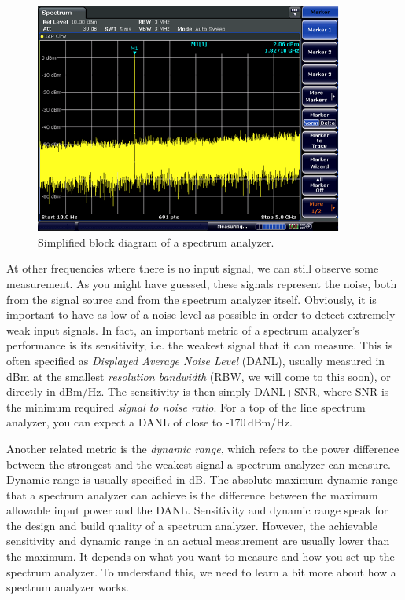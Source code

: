 \documentclass[letterpaper, 11pt]{article}
\begin{document}
\begin{figure}[h]
	\centering
	\includegraphics[width=4in]{sa-screen}
	\caption{Simplified block diagram of a spectrum analyzer.}
	\label{fig:sa-screen}
\end{figure}

At other frequencies where there is no input signal, we can still observe some measurement. As you might have guessed, these signals represent the noise, both from the signal source and from the spectrum analyzer itself. Obviously, it is important to have as low of a noise level as possible in order to detect extremely weak input signals. In fact, an important metric of a spectrum analyzer's performance is its sensitivity, i.e. the weakest signal that it can measure. This is often specified as \textit{Displayed Average Noise Level} (DANL), usually measured in dBm at the smallest \textit{resolution bandwidth} (RBW, we will come to this soon), or directly in dBm/Hz. The sensitivity is then simply DANL+SNR, where SNR is the minimum required \textit{signal to noise ratio}. For a top of the line spectrum analyzer, you can expect a DANL of close to -170\,dBm/Hz.

Another related metric is the \textit{dynamic range}, which refers to the power difference between the strongest and the weakest signal a spectrum analyzer can measure. Dynamic range is usually specified in dB. The absolute maximum dynamic range that a spectrum analyzer can achieve is the difference between the maximum allowable input power and the DANL. 
Sensitivity and dynamic range speak for the design and build quality of a spectrum analyzer. However, the achievable sensitivity and dynamic range in an actual measurement are usually lower than the maximum. It depends on what you want to measure and how you set up the spectrum analyzer. To understand this, we need to learn a bit more about how a spectrum analyzer works. 
\end{document}
